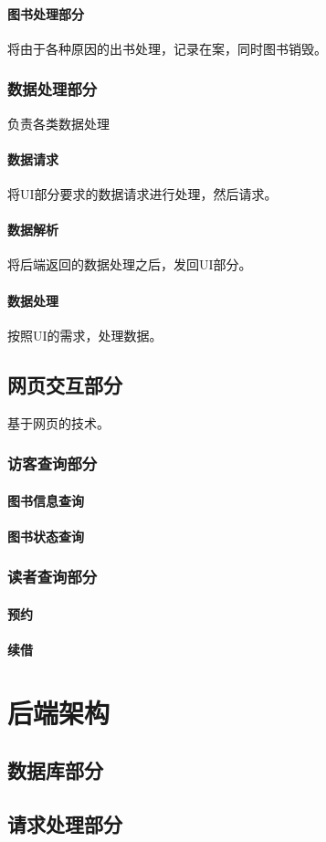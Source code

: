 \documentclass[UTF8]{ctexrep}
\begin{document}
    \subsection{图书处理部分}
    将由于各种原因的出书处理，记录在案，同时图书销毁。
    \section{数据处理部分}
    负责各类数据处理
    \subsection{数据请求}
    将UI部分要求的数据请求进行处理，然后请求。
    \subsection{数据解析}
    将后端返回的数据处理之后，发回UI部分。
    \subsection{数据处理}
    按照UI的需求，处理数据。
    \chapter{网页交互部分}
    基于网页的技术。
    \section{访客查询部分}
    \subsection{图书信息查询}
    \subsection{图书状态查询}
    \section{读者查询部分}
    \subsection{预约}
    \subsection{续借}
    \part{后端架构}
    \setcounter{chapter}{0}
    \chapter{数据库部分}
    \chapter{请求处理部分}
    
\end{document}
